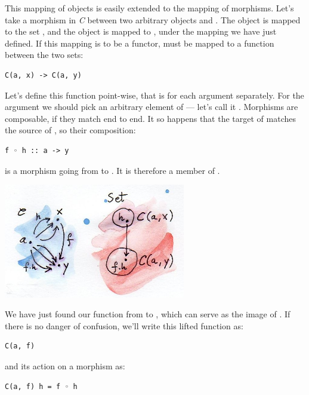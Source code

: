 This mapping of objects is easily extended to the mapping of morphisms.
Let's take a morphism  in \emph{C} between two arbitrary
objects  and . The object  is mapped to
the set , and the object  is mapped to
, under the mapping we have just defined. If this
mapping is to be a functor,  must be mapped to a function
between the two sets:

\begin{Verbatim}[commandchars=\\\{\}]
C(a, x) -> C(a, y)
\end{Verbatim}

Let's define this function point-wise, that is for each argument
separately. For the argument we should pick an arbitrary element of
 --- let's call it . Morphisms are
composable, if they match end to end. It so happens that the target of
 matches the source of , so their composition:

\begin{Verbatim}[commandchars=\\\{\}]
f ◦ h :: a -> y
\end{Verbatim}

is a morphism going from  to . It is therefore a
member of .

\includegraphics[width=3.12500in]{images/hom-functor.jpg}

We have just found our function from  to
, which can serve as the image of . If there
is no danger of confusion, we'll write this lifted function as:

\begin{Verbatim}[commandchars=\\\{\}]
C(a, f)
\end{Verbatim}

and its action on a morphism  as:

\begin{Verbatim}[commandchars=\\\{\}]
C(a, f) h = f ◦ h
\end{Verbatim}

